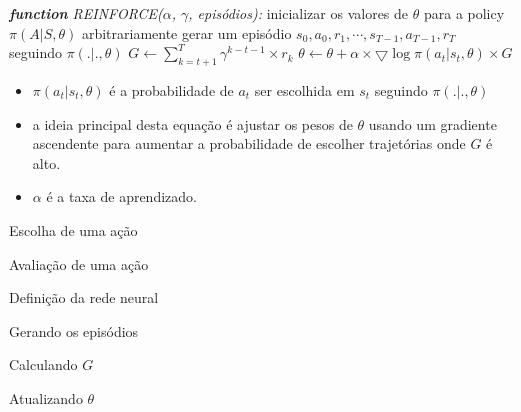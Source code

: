 \documentclass{beamer}
\begin{document}
\begin{frame}
	\begin{algorithmic} 
		\STATE \emph{\textbf{function} REINFORCE($\alpha$, $\gamma$, episódios):}
		\STATE inicializar os valores de $\theta$ para a policy $\pi(A|S,\theta)$ arbitrariamente
		\STATE gerar um episódio ${s_{0},a_{0},r_{1},\cdots,s_{T-1},a_{T-1},r_{T}}$ seguindo $\pi(.|.,\theta)$
		\STATE $G \leftarrow \sum_{k=t+1}^{T} \gamma^{k-t-1} \times r_{k}$
		\STATE \HiLi $\theta \leftarrow \theta + \alpha \times \bigtriangledown \log \pi(a_{t}|s_{t}, \theta) \times G$
		\ENDFOR
		\ENDFOR
	\end{algorithmic}
	
	\begin{itemize}
		\item $\pi(a_{t}|s_{t}, \theta)$ é a probabilidade de $a_{t}$ ser escolhida em $s_{t}$ seguindo $\pi(.|.,\theta)$
		\item a ideia principal desta equação é ajustar os pesos de $\theta$ usando um gradiente ascendente para aumentar a probabilidade de escolher trajetórias onde $G$ é alto.
		\item $\alpha$ é a taxa de aprendizado.  
	\end{itemize}
\end{frame}

\begin{frame}{Escolha de uma ação}
	
\end{frame}

\begin{frame}{Avaliação de uma ação}
	
\end{frame}

\begin{frame}{Definição da rede neural}
	
\end{frame}

\begin{frame}{Gerando os episódios}
	\small
	
\end{frame}

\begin{frame}{Calculando $G$}
	
\end{frame}

\begin{frame}{Atualizando $\theta$}
	\scriptsize
	
\end{frame}
\end{document}
